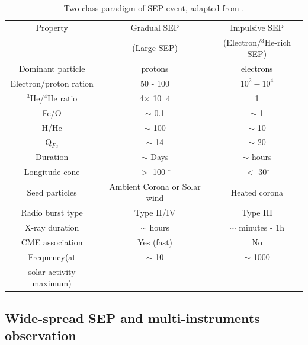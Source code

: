 \begin{table}[!h]
	\centering
	\caption[Two classes of SEP events]{Two-class paradigm of \ac{SEP} event, adapted from \citet{kallenrode2003current,	Desai_Diacalone2016LRSP, Wang2009}.}
	\begin{tabular}{|c|c|c|}
		\hline
		\hline
		Property 	& Gradual \ac{SEP} 	& Impulsive \ac{SEP} \\
					& (Large \ac{SEP})	& (Electron/$^3$He-rich \ac{SEP}) \\
		\hline
		Dominant particle	& protons	& electrons \\
		Electron/proton ration &  50 - 100 &  $10^2 - 10^4$  \\
		$^3$He/$^4$He ratio	& 4$\times$ 10$^-4$ & 1 \\
		Fe/O			& $\sim$ 0.1			& $\sim$ 1	 \\
		H/He		 	& $\sim$ 100			& $\sim$ 10 \\
		Q$_{Fe}$		& $\sim$ 14 			& $\sim$ 20 \\
		Duration		& $\sim$ Days			& $\sim$ hours \\
		Longitude cone	& $>$ 100 $^\circ$		& $<$ 30$^\circ$ \\
		Seed particles	& Ambient Corona or Solar wind & Heated corona \\
		Radio burst type		& Type II/IV	& Type III \\
		X-ray duration	& $\sim$ hours	& $\sim$ minutes - 1h \\
		CME association	& Yes (fast)	& No	\\
		Frequency(at 	& $\sim$ 10	& $\sim$ 1000 \\
		solar activity maximum)	& 	& 	\\
		\hline
	\end{tabular}
	\label{Tab:Two_type_SEP}
\end{table}


\subsection*{Wide-spread SEP and multi-instruments observation}


